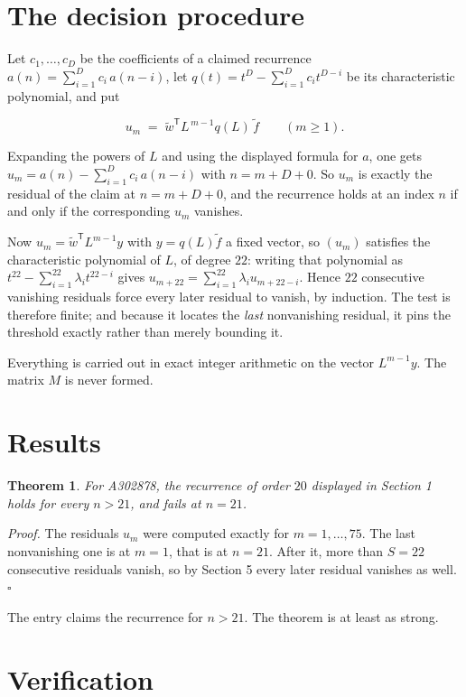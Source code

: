 \documentclass[11pt]{article}
\newtheorem{theorem}{Theorem}
\theoremstyle{definition}
\begin{document}
\section{The decision procedure}

Let $c_1,\dots,c_D$ be the coefficients of a claimed recurrence $a(n) = \sum_{i=1}^{D} c_i\,a(n-i)$, let $q(t) = t^{D} - \sum_{i=1}^{D} c_i t^{D-i}$ be its characteristic polynomial, and put

\[u_m \;=\; \tilde w^{\mathsf T} L^{\,m-1} q(L)\,\tilde f \qquad (m \ge 1).\]

Expanding the powers of $L$ and using the displayed formula for $a$, one gets $u_m = a(n) - \sum_{i=1}^{D} c_i\,a(n-i)$ with $n = m + D + 0$. So $u_m$ is exactly the residual of the claim at $n = m + D + 0$, and the recurrence holds at an index $n$ if and only if the corresponding $u_m$ vanishes.

Now $u_m = \tilde w^{\mathsf T} L^{m-1} y$ with $y = q(L)\tilde f$ a fixed vector, so $(u_m)$ satisfies the characteristic polynomial of $L$, of degree $22$: writing that polynomial as $t^{22} - \sum_{i=1}^{22} \lambda_i t^{22-i}$ gives $u_{m+22} = \sum_{i=1}^{22} \lambda_i u_{m+22-i}$. Hence $22$ consecutive vanishing residuals force every later residual to vanish, by induction. The test is therefore finite; and because it locates the {\itshape last} nonvanishing residual, it pins the threshold exactly rather than merely bounding it.

Everything is carried out in exact integer arithmetic on the vector $L^{m-1}y$. The matrix $M$ is never formed.

\section{Results}

\begin{theorem} For A302878, the recurrence of order $20$ displayed in Section 1 holds for every $n > 21$, and fails at $n = 21$.\end{theorem}

{\itshape Proof.} The residuals $u_m$ were computed exactly for $m = 1,\dots,75$. The last nonvanishing one is at $m = 1$, that is at $n = 21$. After it, more than $S = 22$ consecutive residuals vanish, so by Section 5 every later residual vanishes as well. $\square$

The entry claims the recurrence for $n > 21$. The theorem is at least as strong.

\section{Verification}
\end{document}
